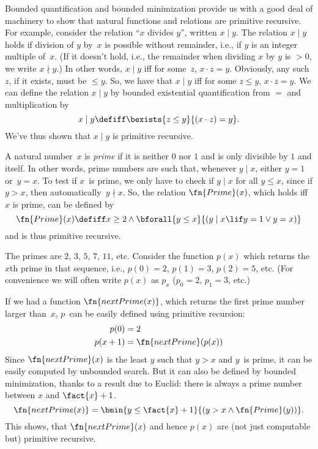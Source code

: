 \documentclass[../../../include/open-logic-section]{subfiles}
\begin{document}

Bounded quantification and bounded minimization provide us with a good
deal of machinery to show that natural functions and relations are
primitive recursive. For example, consider the relation ``$x$
divides $y$'', written $x \mid y$.  The relation $x \mid y$ holds if
division of $y$ by~$x$ is possible without remainder, i.e., if $y$ is
an integer multiple of~$x$.  (If it doesn't hold, i.e., the remainder
when dividing $x$ by $y$ is $> 0$, we write $x \nmid y$.) In other
words, $x \mid y$ iff for some~$z$, $x \cdot z = y$.  Obviously, any
such $z$, if it exists, must be $\leq y$. So, we have that $x \mid y$
iff for some $z \le y$, $x \cdot z = y$.  We can define the relation
$x \mid y$ by bounded existential quantification from $=$ and
multiplication by
\[
x \mid y \defiff \bexists{z \leq y}{(x \cdot z) = y}.
\]
We've thus shown that $x \mid y$ is primitive recursive.

A natural number~$x$ is \emph{prime} if it is neither $0$ nor $1$ and
is only divisible by $1$ and itself. In other words, prime numbers are
such that, whenever $y \mid x$, either $y = 1$ or~$y=x$.  To test if
$x$~is prime, we only have to check if $y \mid x$ for all $y \le x$,
since if $y > x$, then automatically~$y \nmid x$.  So, the relation
$\fn{Prime}(x)$, which holds iff $x$ is prime, can be defined by
\[
\fn{Prime}(x) \defiff x \geq 2 \land \bforall{y \leq x}{(y \mid x \lif y
  = 1 \lor y = x)}
\]
and is thus primitive recursive.

The primes are $2$, $3$, $5$, $7$, $11$, etc. Consider the function
$p(x)$ which returns the $x$th prime in that sequence, i.e., $p(0) =
2$, $p(1) = 3$, $p(2) = 5$, etc. (For convenience we will often write
$p(x)$ as $p_x$ ($p_0=2$, $p_1=3$, etc.)

If we had a function
$\fn{nextPrime(x)}$, which returns the first prime number larger
than~$x$, $p$~can be easily defined using primitive recursion:
\begin{align*}
  p(0) & = 2\\
  p(x+1) & = \fn{nextPrime}(p(x))
\end{align*}
Since $\fn{nextPrime}(x)$ is the least $y$ such that $y > x$ and
$y$~is prime, it can be easily computed by unbounded search. But it
can also be defined by bounded minimization, thanks to a result due to
Euclid: there is always a prime number between $x$ and $\fact{x}+1$.
\[
  \fn{nextPrime(x)} =
  \bmin{y \leq \fact{x}+1}{(y > x \land \fn{Prime}(y))}.
\]
This shows, that $\fn{nextPrime}(x)$ and hence $p(x)$ are (not just
computable but) primitive recursive.
\end{document}
